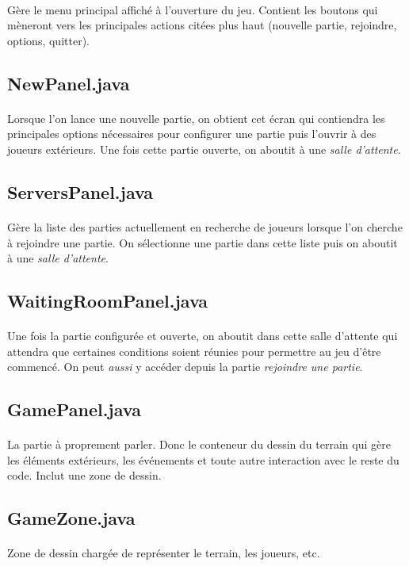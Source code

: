 \documentclass[a4paper,12pt]{report}
\begin{document}
\paragraph{}
Gère le menu principal affiché à l'ouverture du jeu. Contient les boutons qui mèneront vers les principales actions citées plus haut (nouvelle partie, rejoindre, options, quitter).
\subsection{NewPanel.java}
\paragraph{}
Lorsque l'on lance une nouvelle partie, on obtient cet écran qui contiendra les principales options nécessaires pour configurer une partie puis l'ouvrir à des joueurs extérieurs. Une fois cette partie ouverte, on aboutit à une \emph{salle d'attente}.
\subsection{ServersPanel.java}
\paragraph{}
Gère la liste des parties actuellement en recherche de joueurs lorsque l'on cherche à rejoindre une partie. On sélectionne une partie dans cette liste puis on aboutit à une \emph{salle d'attente}.
\subsection{WaitingRoomPanel.java}
\paragraph{}
Une fois la partie configurée et ouverte, on aboutit dans cette salle d'attente qui attendra que certaines conditions soient réunies pour permettre au jeu d'être commencé. On peut \emph{aussi} y accéder depuis la partie \emph{rejoindre une partie}.
\subsection{GamePanel.java}
\paragraph{}
La partie à proprement parler. Donc le conteneur du dessin du terrain qui gère les éléments extérieurs, les événements et toute autre interaction avec le reste du code. Inclut une zone de dessin.
\subsection{GameZone.java}
\paragraph{}
Zone de dessin chargée de représenter le terrain, les joueurs, etc.
\end{document}
